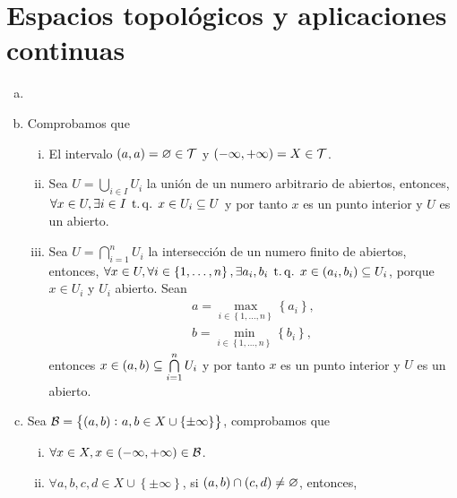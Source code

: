 \chapter{Espacios topológicos y aplicaciones continuas}

\begin{eje}
    \begin{enumerate}[(a)]
        \item[]
        \item Comprobamos que
            \begin{enumerate}[i)]
                \item El intervalo $\left( a, a \right) = \varnothing \in \mathcal{T}$ y $\left( -\infty, +\infty \right) = X \in \mathcal{T}$.
                \item Sea $U = \bigcup\limits_{i \in I} U_i$ la unión de un numero arbitrario de abiertos, entonces, $\forall x \in U, \exists i \in I \operatorname{\;t.q.\;} x \in U_i \subseteq U$ y por tanto $x$ es un punto interior y $U$ es un abierto.
                \item Sea $U = \bigcap\limits_{i = 1}^n U_i$ la intersección de un numero finito de abiertos, entonces, $\forall x \in U, \forall i \in \left\{ 1, \dots, n \right\}, \exists a_i, b_i \operatorname{\;t.q.\;} x \in \left(a_i, b_i\right) \subseteq U_i$, porque $x \in U_i$ y $U_i$ abierto. Sean
                    \begin{gather*}
                        a = \max_{i \in \left\{ 1, \dots, n \right\}} \left\{a_i\right\}, \\
                        b = \min_{i \in \left\{ 1, \dots, n \right\}} \left\{b_i\right\},
                    \end{gather*}
                entonces $x \in \left( a, b \right) \subseteq \bigcap\limits_{i = 1}^n U_i$ y por tanto $x$ es un punto interior y $U$ es un abierto.
            \end{enumerate}
        \item Sea $\mathcal{B} = \left\{ \left( a, b \right) \colon a, b \in X \cup \left\{ \pm \infty \right\} \right\}$, comprobamos que
            \begin{enumerate}[i)]
                \item $\forall x \in X, x \in \left( -\infty, +\infty \right) \in \mathcal{B}$.
                \item $\forall a, b, c, d \in X \cup \left\{ \pm \infty \right\}$, si $\left( a, b \right) \cap \left( c, d \right) \neq \varnothing$, entonces,

\end{enumerate}
\end{enumerate}
\end{eje}
